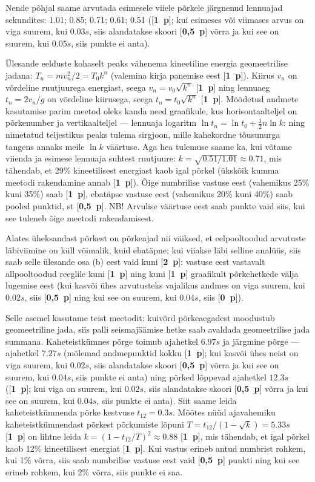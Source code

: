 \documentclass[11pt,a5paper]{article}
\newcommand{\p}[1]{[\textbf{#1~p}]}
\begin{document}
Nende põhjal saame arvutada esimesele viiele põrkele järgnenud lennuajad sekundites: \num{1,01}; \num{0,85}; \num{0,71}; \num{0,61}; \num{0,51} (\p1; kui esimeses või viimases arvus on viga suurem, kui $\SI {0.03}s$, siis alandatakse skoori \p{0,5} võrra ja kui see on suurem, kui $\SI{0.05}s$, siis punkte ei anta).

Ülesande eelduste kohaselt peaks vähenema kineetiline energia geomeetrilise jadana: $T_n=mv_n^2/2=T_0k^n$ (valemina kirja panemise eest \p1). Kiirus $v_n$ on võrdeline ruutjuurega energiast, seega $v_n=v_0\sqrt{k^n}$ \p1 ning lennuaeg $t_n=2v_n/g$ on võrdeline kiirusega, seega $t_n=t_0\sqrt{k^n}$ \p1. Mõõdetud andmete kasutamise parim meetod oleks kanda need graafikule, kus horisontaalteljel on põrkenumber ja vertikaalteljel --- lennuaja logaritm $\ln t_n=\ln t_0 + \frac 12n\ln k$:  ning nimetatud teljestikus peaks tulema sirgjoon, mille kahekordne tõusunurga tangens annaks meile $\ln k$ väärtuse. Aga hea tulemuse saame ka, kui võtame viienda ja esimese lennuaja suhtest ruutjuure:  $k=\sqrt{0.51/1.01}\approx 0.71$, mis tähendab, et 29\% kineetilisest energiast kaob igal põrkel (ükskõik kumma meetodi rakendamine annab \p1). Õige numbrilise vastuse eest (vahemikus 25\% kuni 35\%) saab \p1, ebatäpse vastuse eest (vahemikus 20\% kuni 40\%) saab pooled punktid, st \p{0,5}. NB! Arvulise väärtuse eest saab punkte vaid siis, kui see tuleneb õige meetodi rakendamisest.

\osa Alates üheksandast põrkest on põrkeajad nii väiksed, et eelpooltoodud arvutuste läbiviimine on küll võimalik, kuid ebatäpne; kui viiakse läbi selline analüüs, siis saab selle ülesande osa (b) eest vaid kuni \p2: vastuse eest vastavalt allpooltoodud reeglile kuni \p1 ning kuni \p1 graafikult põrkehetkede välja lugemise eest (kui kasvõi ühes arvutusteks vajalikus andmes on viga suurem, kui $\SI{0.02}s$, siis \p{0,5} ning kui see on suurem, kui $\SI{0.04}s$, siis \p0).

Selle asemel kasutame teist meetodit: kuivõrd põrkeaegadest moodustub geomeetriline jada, siis palli seismajäämise hetke saab avaldada geomeetrilise jada summana. Kaheteistkümnes põrge toimub ajahetkel $\SI{6.97}s$ ja järgmine põrge --- ajahetkel $\SI{7.27}s$ (mõlemad andmepunktid kokku \p1; kui kasvõi ühes neist on viga suurem, kui $\SI {0.02}s$, siis alandatakse skoori \p{0,5} võrra ja kui see on suurem, kui $\SI {0.04}s$, siis punkte ei anta) ning põrked lõppevad ajahetkel $\SI{12.3}s$ (\p1; kui viga on suurem, kui $\SI {0.02}s$, siis alandatakse skoori \p{0,5} võrra ja kui see on suurem, kui $\SI {0.04}s$, siis punkte ei anta). Siit saame leida kaheteistkümnenda põrke kestvuse $t_{12}=\SI{0.3}s$.
Mõõtes nüüd ajavahemiku kaheteistkümnendast põrkest põrkumiste lõpuni $T=t_{12}/(1-\sqrt k)=\SI{5.33}s$ \p1 on lihtne leida $k=(1-t_{12}/T)^2\approx 0.88$ \p1, mis tähendab, et igal põrkel kaob 12\% kineetilisest energiat \p1. Kui vastus erineb antud numbrist rohkem, kui 1\% võrra, siis saab numbrilise vastuse eest vaid \p{0,5} punkti ning kui see erineb rohkem, kui 2\% võrra, siis punkte ei saa.
\end{document}
